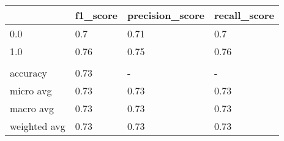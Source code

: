 \begin{tabular}{llll}
\toprule
{} & f1\_score & precision\_score & recall\_score \\
\midrule
0.0          &      0.7 &            0.71 &          0.7 \\
1.0          &     0.76 &            0.75 &         0.76 \\
             &          &                 &              \\
accuracy     &     0.73 &               - &            - \\
micro avg    &     0.73 &            0.73 &         0.73 \\
macro avg    &     0.73 &            0.73 &         0.73 \\
weighted avg &     0.73 &            0.73 &         0.73 \\
\bottomrule
\end{tabular}
